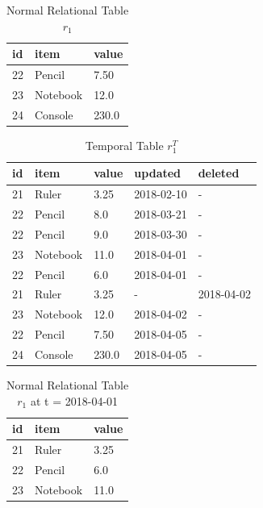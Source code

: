 		\begin{center}
		\begin{table}[t]
			\centering
			\caption{Normal Relational Table $r_1$}
			\label{table:normal_table_2}
			\begin{tabular}{p{4cm}p{4cm}p{4cm}}
				\hline
				id & item      & value  \\ \hline
				22 & Pencil    & 7.50 \\
				23 & Notebook & 12.0   \\ 
				24 & Console & 230.0 \\ \hline
			\end{tabular}
		\end{table}

		\begin{table}[t]
			\centering
			\caption{Temporal Table $r_1^T$}
			\label {table:temporal_table_2}
			\begin{tabular}{p{1cm}p{2cm}p{3cm}p{3cm}p{2cm}}
				\hline
				id & item      & value  & updated  & deleted\\ \hline
				21 & Ruler    & 3.25  & 2018-02-10  &  - \\  
				22 & Pencil    & 8.0  & 2018-03-21  &  - \\
				22 & Pencil    & 9.0  & 2018-03-30  &  -\\
				23 & Notebook & 11.0  & 2018-04-01 & - \\
				22 & Pencil & 6.0  & 2018-04-01 & - \\
				21 & Ruler    & 3.25  & -  &  2018-04-02 \\
				23 & Notebook & 12.0  & 2018-04-02 & - \\ 
				22 & Pencil & 7.50  & 2018-04-05 & - \\ 
				24 & Console & 230.0  & 2018-04-05 & - \\ \hline
			\end{tabular}
		\end{table}
		\end{center}
		\begin{center}
		\begin{table}
			\centering
			\caption{Normal Relational Table $r_1$ at t = 2018-04-01}
			\label{table:normal_table_2_t}
			\begin{tabular}{p{4cm}p{4cm}p{4cm}}
				\hline
				id & item  & value  \\ \hline
				21 & Ruler & 3.25 \\
				22 & Pencil & 6.0   \\ 
				23 & Notebook & 11.0 \\ \hline
			\end{tabular}
		\end{table}
		\end{center}

